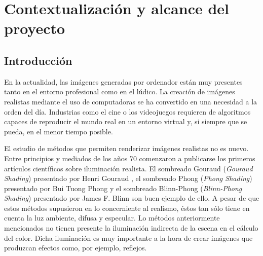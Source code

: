 \documentclass[titlepage,12pt]{report}
\begin{document}
\iftrue

\newpage
\tableofcontents*
\fi

\newpage

\chapter{Contextualización y alcance del proyecto}

\section{Introducción} \label{introduction}

En la actualidad, las imágenes generadas por ordenador están muy presentes tanto en el entorno profesional como en el lúdico. La creación de imágenes realistas mediante el uso de computadoras se ha convertido en una necesidad a la orden del día. Industrias como el cine o los videojuegos requieren de algoritmos capaces de reproducir el mundo real en un entorno virtual y, si siempre que se pueda, en el menor tiempo posible.

El estudio de métodos que permiten renderizar imágenes realistas no es nuevo. Entre principios y mediados de los años 70 comenzaron a publicarse los primeros artículos científicos sobre iluminación realista. El sombreado Gouraud (\textit{Gouraud Shading}) presentado por Henri Gouraud \cite{Henri1971}, el sombreado Phong (\textit{Phong Shading}) presentado por Bui Tuong Phong \cite{Phong1975} y el sombreado Blinn-Phong (\textit{Blinn-Phong Shading}) presentado por James F. Blinn \cite{Blinn1977} son buen ejemplo de ello. A pesar de que estos métodos supusieron en lo concerniente al realismo, éstos tan sólo tiene en cuenta la luz ambiente, difusa y especular. Lo métodos anteriormente mencionados no tienen presente la iluminación indirecta de la escena en el cálculo del color. Dicha iluminación es muy importante a la hora de crear imágenes que produzcan efectos como, por ejemplo, reflejos.
\end{document}
